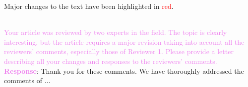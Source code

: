 \documentclass[a4paper,12pt]{article}
\begin{document}
Major changes to the text have been highlighted in \textcolor{red}{red}.
\clearpage
\newpage

\clearpage
\newpage


\\

\noindent \textcolor{violet}{Your article was reviewed by two experts in the field. The topic is clearly interesting, but the article requires a major revision taking into account all the reviewers' comments, especially those of Reviewer 1. Please provide a letter describing all your changes and responses to the reviewers' comments.}\\


\noindent \textcolor{violet}{\bf Response}: Thank you for these comments. We have thoroughly addressed the comments of $\ldots$ \\
\end{document}
